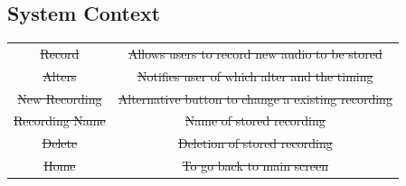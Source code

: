 \documentclass[12pt, titlepage]{article}
\begin{document}
\subsection {System Context}
\begin{center}
  \begin{tabular}{c c}
  \sout{Record} & \sout{Allows users to record new audio to be stored} \\
  \sout{Alters} & \sout{Notifies user of which alter and the timing} \\
  \sout{New Recording} & \sout{Alternative button to change a existing recording} \\
  \sout{Recording Name} & \sout{Name of stored recording} \\
  \sout{Delete} & \sout{Deletion of stored recording} \\
  \sout{Home} & \sout{To go back to main screen} \\
  \end{tabular}
\end{center}
\end{document}
